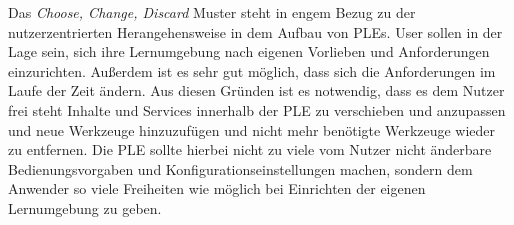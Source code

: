 Das \emph{Choose, Change, Discard}\label{wilson_patterns:choose_change_discard} Muster steht in engem Bezug zu der nutzerzentrierten Herangehensweise in dem Aufbau von \acp{PLE}. User sollen in der Lage sein, sich ihre Lernumgebung nach eigenen Vorlieben und Anforderungen einzurichten. Außerdem ist es sehr gut möglich, dass sich die Anforderungen im Laufe der Zeit ändern. Aus diesen Gründen ist es notwendig, dass es dem Nutzer frei steht Inhalte und Services innerhalb der \ac{PLE} zu verschieben und anzupassen und neue Werkzeuge hinzuzufügen und nicht mehr benötigte Werkzeuge wieder zu entfernen. Die \ac{PLE} sollte hierbei nicht zu viele vom Nutzer nicht änderbare Bedienungsvorgaben und Konfigurationseinstellungen machen, sondern dem Anwender so viele Freiheiten wie möglich bei Einrichten der eigenen Lernumgebung zu geben.

